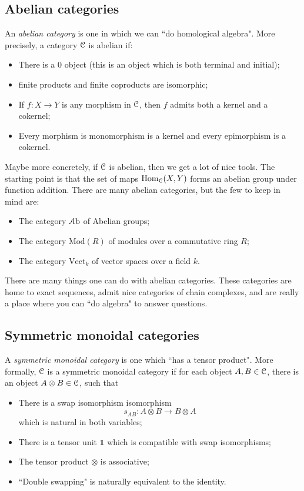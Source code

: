 \documentclass[10pt]{amsart}
\newcommand{\euscr}[1]{\EuScript{#1}}
\theoremstyle{definition}
\newcommand{\cdef}[1]{\textcolor{Bittersweet}{#1}}
\begin{document}

\subsection*{Abelian categories}
An \cdef{\emph{abelian category}} is one in which we can ``do homological algebra". More precisely, a category $\euscr{C}$ is abelian if:
\begin{itemize}
    \item There is a $0$ object (this is an object which is both terminal and initial);
    \item finite products and finite coproducts are isomorphic;
    \item If $f:X \to Y$ is any morphism in $\euscr{C}$, then $f$ admits both a kernel and a cokernel;
    \item Every morphism is monomorphism is a kernel and every epimorphism is a cokernel.
\end{itemize}
Maybe more concretely, if $\euscr{C}$ is abelian, then we get a lot of nice tools. The starting point is that the set of maps $\text{Hom}_\euscr{C}(X, Y)$ forms an abelian group under function addition. There are many abelian categories, but the few to keep in mind are:
\begin{itemize}
    \item The category $\euscr{A}\mathrm{b}$ of Abelian groups;
    \item The category $\mathrm{Mod}(R)$ of modules over a commutative ring $R$;
    \item The category $\mathrm{Vect}_k$ of vector spaces over a field $k$.
\end{itemize}
There are many things one can do with abelian categories. These categories are home to exact sequences, admit nice categories of chain complexes, and are really a place where you can ``do algebra" to answer questions.

\subsection*{Symmetric monoidal categories}
A \cdef{\emph{symmetric monoidal category}} is one which ``has a tensor product". More formally, $\euscr{C}$ is a symmetric monoidal category if for each object $A, B \in \euscr{C}$, there is an object $A \otimes B \in \euscr{C}$, such that
\begin{itemize}
    \item There is a swap isomorphism isomorphism
    \[
    s_{AB}:A \otimes B \to B \otimes A
    \]
    which is natural in both variables;
    \item There is a tensor unit $\mathbb{1}$ which is compatible with swap isomorphisms;
    \item The tensor product $\otimes$ is associative;
    \item ``Double swapping" is naturally equivalent to the identity.
\end{itemize}
\end{document}

